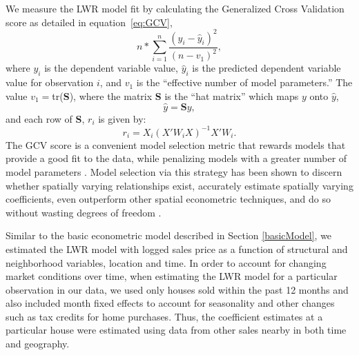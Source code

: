\documentclass{article}\usepackage{graphicx, color}
\begin{document}
We measure the LWR model fit by calculating the Generalized Cross Validation score as detailed in equation~\eqref{eq:GCV},
\begin{equation}\label{eq:GCV}
n*\sum_{i=1}^{n}\frac{(y_i-\hat{y}_i)^2}{(n-v_1)^2}, 
\end{equation} 
where $y_i$ is the dependent variable value, $\hat{y}_i$ is the predicted dependent variable value for observation $i$, and $v_1$ is the ``effective number of model parameters.'' The value  
$v_1=$tr(\textbf{S}), where the matrix \textbf{S} is the ``hat matrix'' which maps $y$ onto $\hat{y}$,
                   \begin{equation*}
                   \hat{y}=\textbf{S}y,
                   \end{equation*}
                   and each row of \textbf{S}, $r_i$ is given by:
                     \begin{equation*}
                   r_i=X_i(X'W_iX)^{-1}X'W_i.
                   \end{equation*}
The GCV score is a convenient model selection metric that rewards models that provide a good fit to the data, while penalizing models with a greater number of model parameters \citep{Loader1999, McMillen2010}. Model selection via this strategy has been shown to discern whether spatially varying relationships exist, accurately estimate spatially varying coefficients, even outperform other spatial econometric techniques, and do so without wasting degrees of freedom \citep{Paez2011, McMillen2010, McMillen2012}. 

Similar to the basic econometric model described in Section \ref{basicModel}, we estimated the LWR model with logged sales price as a function of structural and neighborhood variables, location and time. In order to account for changing market conditions over time, when estimating the LWR model for a particular observation in our data, we used only houses sold within the past 12 months and also included month fixed effects to account for seasonality and other changes such as tax credits for home purchases. Thus, the coefficient estimates at a particular house were estimated using data from other sales nearby in both time and geography.
\end{document}
